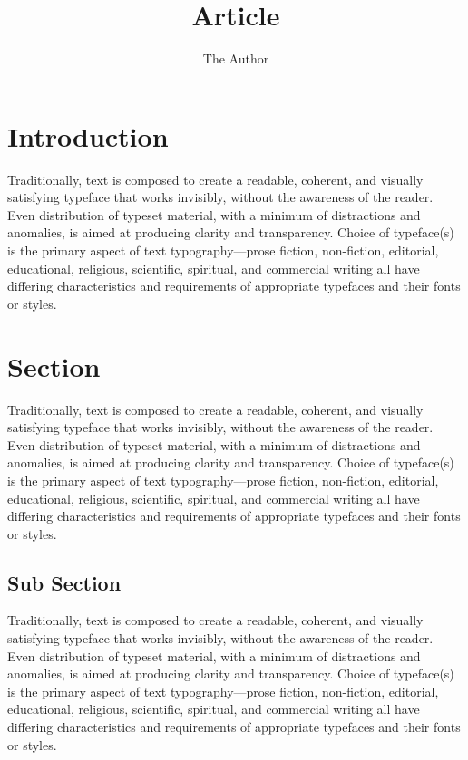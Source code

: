 \documentclass[twoside]{xarticle}
\title{\hologo{XeLaTeX} Article}
\author{The Author}
\date{\relax}
\begin{document}

\thispagestyle{empty}
\maketitle
\tableofcontents

\clearpage

\pagestyle{fancy}

\section*{Introduction}

\thispagestyle{empty}
Traditionally, text is composed to create a readable, coherent, and visually
satisfying typeface that works invisibly, without the awareness of the reader.
Even distribution of typeset material, with a minimum of distractions and
anomalies, is aimed at producing clarity and transparency. Choice of typeface(s)
is the primary aspect of text typography—prose fiction, non-fiction, editorial,
educational, religious, scientific, spiritual, and commercial writing all have
differing characteristics and requirements of appropriate typefaces and their
fonts or styles.

\clearpage

\thispagestyle{empty}
\section{Section}

Traditionally, text is composed to create a readable, coherent, and visually
satisfying typeface that works invisibly, without the awareness of the reader.
Even distribution of typeset material, with a minimum of distractions and
anomalies, is aimed at producing clarity and transparency. Choice of typeface(s)
is the primary aspect of text typography—prose fiction, non-fiction, editorial,
educational, religious, scientific, spiritual, and commercial writing all have
differing characteristics and requirements of appropriate typefaces and their
fonts or styles.

\subsection{Sub Section}

Traditionally, text is composed to create a readable, coherent, and visually
satisfying typeface that works invisibly, without the awareness of the reader.
Even distribution of typeset material, with a minimum of distractions and
anomalies, is aimed at producing clarity and transparency. Choice of typeface(s)
is the primary aspect of text typography—prose fiction, non-fiction, editorial,
educational, religious, scientific, spiritual, and commercial writing all have
differing characteristics and requirements of appropriate typefaces and their
fonts or styles.
\end{document}
